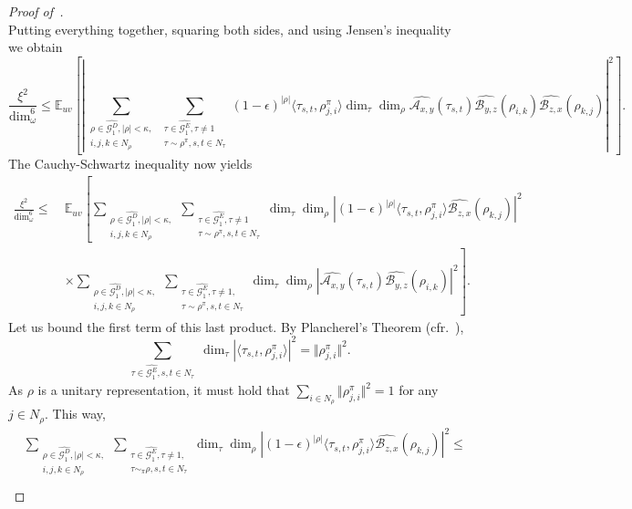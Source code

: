 \documentclass[a4paper,11pt]{article}
\theoremstyle{definition}
\newcommand{\ex}[1]{\mathbb{E}_{#1}}
\newcommand{\gr}{\mathscr{G}}
\newcommand{\A}{\mathcal{A}}
\newcommand{\B}{\mathcal{B}}
\begin{document}
\begin{proof}[Proof of~]
\[\]
Putting everything together, squaring both sides, and using Jensen's inequality we obtain 
\[
\frac{\xi^2}{\dim_\omega^6}
\leq 
\ex{uv}\left[
\left\vert
\sum_{\substack{\rho\in \widehat{\gr_1^D},
 |\rho| < \kappa, \\ i,j,k\in N_\rho}}
 \sum_{\substack{\tau\in \widehat{\gr_1^E}, \tau\neq 1 \\ \tau \sim \rho^\pi, s,t\in N_\tau}}
 (1-\epsilon)^{|\rho|} 
 \langle \tau_{s,t}, \rho^\pi_{j,i} \rangle
 \dim_\tau \dim_\rho \widehat{\A_{x,y}}(\tau_{s,t})
 \widehat{{\B}_{y,z}}(\rho_{i,k}) \widehat{{\B}_{z,x}}(\rho_{k,j}) \right\vert^2 \right].
\]
The Cauchy-Schwartz inequality now yields  
\begin{align} 
\nonumber
\frac{\xi^2}{\dim_\omega^6} \leq \ &
\ex{uv}\left[
\sum_{\substack{\rho\in \widehat{\gr_1^D},
 |\rho| < \kappa, \\ i,j,k\in N_\rho}}
 \sum_{\substack{\tau\in \widehat{\gr_1^E},  \tau\neq 1\\  \tau \sim \rho^\pi, s,t \in N_\tau}}
 \dim_\tau \dim_\rho
 \left\vert
 (1-\epsilon)^{|\rho|} 
 \langle \tau_{s,t}, \rho^\pi_{j,i} \rangle
  \widehat{{\B}_{z,x}}(\rho_{k,j}) \right\vert^2 
 \right. \\
 \label{eq:lem25_2}
 & 
 \left.
 \times
\sum_{\substack{\rho\in \widehat{\gr_1^D},
 |\rho| < \kappa, \\ i,j,k\in N_\rho}}
 \sum_{\substack{\tau\in \widehat{\gr_1^E}, \tau\neq 1, \\ \tau \sim \rho^\pi, s,t\in N_\tau}}
\dim_\tau \dim_\rho  \left\vert
 \widehat{\A_{x,y}}(\tau_{s,t})
 \widehat{{\B}_{y,z}}(\rho_{i,k}) \right\vert^2 \right].
\end{align}
Let us bound the first term of this last product. 
By Plancherel's Theorem (cfr.~),
\[
\sum_{\substack{\tau\in \widehat{\gr_1^E}, s,t\in N_\tau}}
\dim_\tau
\left\vert
 \langle \tau_{s,t}, \rho^\pi_{j,i} \rangle \right\vert^2= 
 \Vert \rho^\pi_{j,i} \Vert^2.
\]
As $\rho$ is a unitary representation, it must hold that
$\sum_{i\in N_\rho} \Vert \rho^\pi_{j,i} \Vert^2=1$ for any $j\in N_\rho$. This way,
\begin{align*}
&\sum_{\substack{\rho\in \widehat{\gr_1^D},
 |\rho| < \kappa, \\ i,j,k\in N_\rho}}
 \sum_{\substack{\tau\in \widehat{\gr_1^E}, \tau\neq 1, \\ \tau \sim_\pi \rho, s,t \in N_\tau}}
 \dim_\tau \dim_\rho
 \left\vert
 (1-\epsilon)^{|\rho|} 
 \langle \tau_{s,t}, \rho^\pi_{j,i} \rangle 
  \widehat{{\B}_{z,x}}(\rho_{k,j}) \right\vert^2 \leq \\

\end{align*}
\end{proof}
\end{document}
